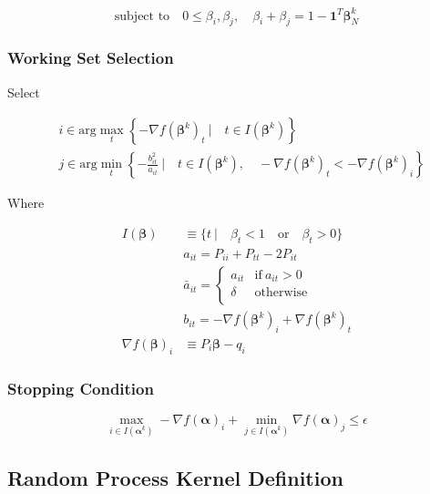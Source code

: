 \documentclass[10pt]{article}
\begin{document}
\begin{equation}
\text{subject to} \quad 0 \le \beta_i, \beta_j, \quad \beta_i + \beta_j = 1 - \mathbf{1}^T \boldsymbol{\beta}_N^k
\end{equation}

\subsubsection{ Working Set Selection }

Select

\begin{align}
& i \in \text{arg} \max_t \left\{ -\nabla f( \boldsymbol{\beta}^k )_t \ | \quad t \in I( \boldsymbol{\beta}^k ) \right\} \\
& j \in \text{arg} \min_t \left\{ -\frac{b_{it}^2}{a_{it}} \ | \quad t \in I( \boldsymbol{\beta}^k ), \quad -\nabla f(\boldsymbol{\beta}^k)_t < -\nabla f(\boldsymbol{\beta}^k)_i \right\}
\end{align}

Where

\begin{align}
I( \boldsymbol{\beta} ) & \equiv \{ t \ | \quad \beta_t < 1 \quad \text{or} \quad \beta_t > 0 \} \\
& a_{it} = P_{ii} + P_{tt} - 2P_{it} \\
& \bar{a}_{it} = \begin{cases}
a_{it} & \text{if} \ a_{it} > 0 \\
\delta & \text{otherwise} \\
\end{cases} \\
& b_{it} = -\nabla f(\boldsymbol{\beta}^k)_i + \nabla f(\boldsymbol{\beta}^k)_t \\
\nabla f( \boldsymbol{\beta} )_i & \equiv P_i \boldsymbol{\beta} - q_i
\end{align}


\subsubsection{ Stopping Condition }

\begin{equation}
\max_{i \in I(\boldsymbol{\alpha}^k)} -\nabla f( \boldsymbol{\alpha} )_i + \min_{j \in I(\boldsymbol{\alpha}^k)} \nabla f( \boldsymbol{\alpha} )_j \le \epsilon
\end{equation}

\subsection{  Random Process Kernel Definition }
\end{document}
